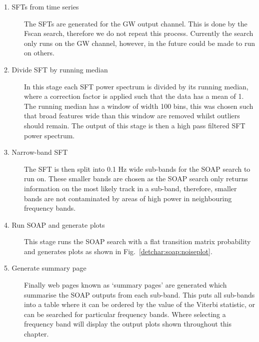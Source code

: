 \begin{description}
	\item[1. \glspl{SFT} from time series] The \glspl{SFT} are generated for the \gls{GW} output channel. This is done by the Fscan search, therefore we do not repeat this process. Currently the search only runs on the \gls{GW} channel, however, in the future could be made to run on others.
	
	\item[2. Divide \gls{SFT} by running median] In this stage each
\gls{SFT} power spectrum is divided by its running median, where a correction factor is applied such that the data has a mean of 1. 
The running median has a window of width 100 bins, this was chosen such that broad features wide than this window are removed whilst outliers should remain. 
The output of this stage is then a high pass filtered \gls{SFT} power spectrum.
	
        \item[3. Narrow-band \gls{SFT}] The \gls{SFT} is then split into 0.1 Hz
wide sub-bands for the SOAP search to run on. These smaller bands are chosen as
the SOAP search only returns information on the most likely track in a sub-band, therefore, smaller
bands are not contaminated by areas of high power in neighbouring frequency
bands. 
	
        \item[4. Run SOAP and generate plots] This stage runs the SOAP search
with a flat transition matrix probability and generates plots as shown in
Fig.~\ref{detchar:soap:noiseplot}.
	
        \item[5. Generate summary page] Finally web pages known as `summary pages' are generated which summarise the SOAP outputs from each sub-band.
        This puts all sub-bands into a table where it can be ordered
by the value of the Viterbi statistic, or can be searched for particular
frequency bands.  Where selecting a frequency band will display the output plots shown throughout this chapter.
\end{description}

